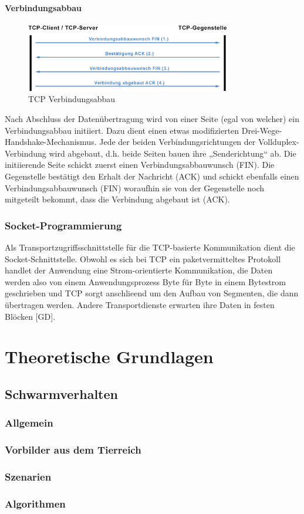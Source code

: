 \paragraph{Verbindungsabbau}
\begin{figure}[ht]
	\centering
	\includegraphics[width=0.8\textwidth]{images/Verbindungsabbau.png}
	\caption[TCP Verbindungsabbau]{TCP Verbindungsabbau}
	\label{fig:<Sprungmakre>}
\end{figure}
Nach Abschluss der Datenübertragung wird von einer Seite (egal von welcher) ein Verbindungsabbau initiiert. Dazu dient einen etwas modifizierten Drei-Wege-Handshake-Mechanismus. Jede der beiden Verbindungsrichtungen der Vollduplex-Verbindung wird abgebaut, d.h. beide Seiten bauen ihre „Senderichtung“ ab. Die initiierende Seite schickt zuerst einen Verbindungsabbauwunsch (FIN). Die Gegenstelle bestätigt den Erhalt der Nachricht (ACK) und schickt ebenfalls einen Verbindungsabbauwunsch (FIN) woraufhin sie von der Gegenstelle noch mitgeteilt bekommt, dass die Verbindung abgebaut ist (ACK).
\subsubsection{Socket-Programmierung}
Als Transportzugriffsschnittstelle für die TCP-basierte Kommunikation dient die Socket-Schnittstelle.
Obwohl es sich bei TCP ein paketvermitteltes Protokoll handlet der Anwendung eine Strom-orientierte Kommunikation, die Daten werden also von einem Anwendungsprozess Byte für Byte in einem Bytestrom geschrieben und TCP sorgt anschlieend um den Aufbau von Segmenten, die dann übertragen werden. Andere Transportdienste erwarten ihre Daten in festen Blöcken [GD].

\newpage
\section{Theoretische Grundlagen}

\subsection{Schwarmverhalten}
\subsubsection{Allgemein}
\subsubsection{Vorbilder aus dem Tierreich}
\subsubsection{Szenarien}
\subsubsection{Algorithmen}
